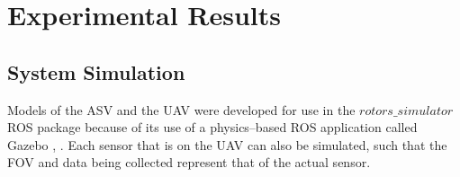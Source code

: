 \documentclass[letterpaper, 12 pt, conference]{ieeeconf}
\begin{document}
\section{Experimental Results}
% 
\subsection{System Simulation}
% 
Models of the ASV and the UAV were developed for use in the $rotors\_simulator$ ROS package because of its use of a physics--based ROS application called Gazebo \cite{inproceedings}, \cite{rotors:2016}. Each sensor that is on the UAV can also be simulated, such that the FOV and data being collected represent that of the actual sensor.
\end{document}
